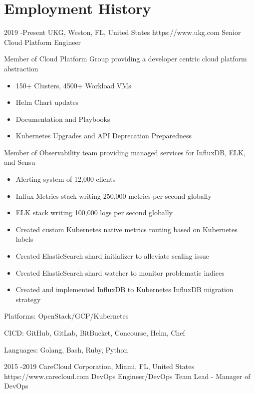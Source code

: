 \documentclass[10pt]{article} %
\begin{document}
\section{Employment History}
\job
{2019 -}{Present}
{UKG, Weston, FL, United States}
{https://www.ukg.com}
{Senior Cloud Platform Engineer}
{\begin{itemize-noindent}
\item{Member of Cloud Platform Group providing a developer centric cloud platform abstraction}
  \begin{itemize}
    \item{150+ Clusters, 4500+ Workload VMs}
    \item{Helm Chart updates}
    \item{Documentation and Playbooks}
    \item{Kubernetes Upgrades and API Deprecation Preparedness}
  \end{itemize}
\item{Member of Observability team providing managed services for InfluxDB, ELK, and Sensu}
  \begin{itemize}
    \item{Alerting system of 12,000 clients}
    \item{Influx Metrics stack writing 250,000 metrics per second globally}
    \item{ELK stack writing 100,000 logs per second globally}
    \item{Created custom Kubernetes native metrics routing based on Kubernetes labels}
    \item{Created ElasticSearch shard initializer to alleviate scaling issue}
    \item{Created ElasticSearch shard watcher to monitor problematic indices}
    \item{Created and implemented InfluxDB to Kubernetes InfluxDB migration strategy}
  \end{itemize}
\item{Platforms: OpenStack/GCP/Kubernetes}
\item{CICD: GitHub, GitLab, BitBucket, Concourse, Helm, Chef}
\item{Languages: Golang, Bash, Ruby, Python}
\end{itemize-noindent}}
\job
{2015 -}{2019}
{CareCloud Corporation, Miami, FL, United States}
{https://www.carecloud.com}
{DevOps Engineer/DevOps Team Lead - Manager of DevOps}
\end{document}
